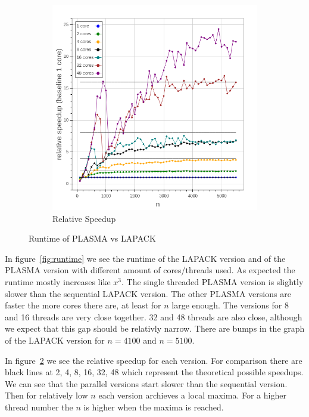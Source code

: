 \documentclass[a4paper,final,ngerman,english]{article}
\begin{document}
\begin{figure}[h!]
\begin{subfigure}{0.4\textwidth}
		\includegraphics[width=\textwidth]{rel_speedup}
		\caption{Relative Speedup}
\label{fig:rel}
	\end{subfigure}
	\caption{Runtime of PLASMA vs LAPACK}
\end{figure}

In figure~\ref{fig:runtime}
we see the runtime of the LAPACK version and of the PLASMA version with different amount of cores/threads used.
As expected the runtime mostly increases like \(x^3\).
The single threaded PLASMA version is slightly slower than the sequential LAPACK version.
The other PLASMA versions are faster the more cores there are, at least for $n$ large enough.
The versions for 8 and 16 threads are very close together. 32 and 48 threads are also close, although
we expect that this gap should be relativly narrow.
There are bumps in the graph of the LAPACK version for \(n = 4100\) and \(n = 5100 \).

In figure~\ref{fig:rel}
we see the relative speedup for each version.
For comparison there are black lines at 2, 4, 8, 16, 32, 48 which represent the theoretical possible speedups.
We can see that the parallel versions start slower than the sequential version.
Then for relatively low $n$ each version archieves a local maxima.
For a higher thread number the $n$ is higher when the maxima is reached. 
\end{document}
